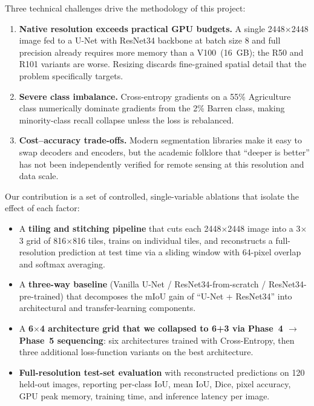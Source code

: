 \documentclass[conference,letterpaper,10pt]{IEEEtran}
\begin{document}
Three technical challenges drive the methodology of this project:

\begin{enumerate}
\item \textbf{Native resolution exceeds practical GPU budgets.} A single
      2448$\times$2448 image fed to a U-Net with ResNet34 backbone at batch
      size 8 and full precision already requires more memory than a
      V100~(16~GB); the R50 and R101 variants are worse. Resizing discards
      fine-grained spatial detail that the problem specifically targets.
\item \textbf{Severe class imbalance.} Cross-entropy gradients on a 55\%
      Agriculture class numerically dominate gradients from the 2\% Barren
      class, making minority-class recall collapse unless the loss is
      rebalanced.
\item \textbf{Cost--accuracy trade-offs.} Modern segmentation libraries make
      it easy to swap decoders and encoders, but the academic folklore that
      ``deeper is better'' has not been independently verified for remote
      sensing at this resolution and data scale.
\end{enumerate}

Our contribution is a set of controlled, single-variable ablations that
isolate the effect of each factor:

\begin{itemize}
\item A \textbf{tiling and stitching pipeline} that cuts each 2448$\times$2448
      image into a 3$\times$3 grid of 816$\times$816 tiles, trains on
      individual tiles, and reconstructs a full-resolution prediction at test
      time via a sliding window with 64-pixel overlap and softmax averaging.
\item A \textbf{three-way baseline} (Vanilla U-Net / ResNet34-from-scratch /
      ResNet34-pre-trained) that decomposes the mIoU gain of
      ``U-Net + ResNet34'' into architectural and transfer-learning
      components.
\item A \textbf{6$\times$4 architecture grid that we collapsed to 6+3 via
      Phase~4 $\rightarrow$ Phase~5 sequencing}: six architectures trained
      with Cross-Entropy, then three additional loss-function variants on the
      best architecture.
\item \textbf{Full-resolution test-set evaluation} with reconstructed
      predictions on 120 held-out images, reporting per-class IoU, mean
      IoU, Dice, pixel accuracy, GPU peak memory, training time, and
      inference latency per image.
\end{itemize}
\end{document}
